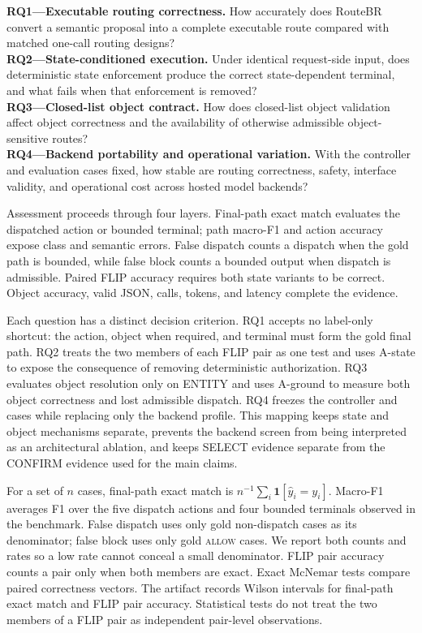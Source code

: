 \documentclass[10pt,conference,a4paper]{IEEEtran}
\newcommand{\method}{RouteBR}
\begin{document}
\noindent\textbf{RQ1---Executable routing correctness.} How accurately does \method{} convert a semantic proposal into a complete executable route compared with matched one-call routing designs?\\
\textbf{RQ2---State-conditioned execution.} Under identical request-side input, does deterministic state enforcement produce the correct state-dependent terminal, and what fails when that enforcement is removed?\\
\textbf{RQ3---Closed-list object contract.} How does closed-list object validation affect object correctness and the availability of otherwise admissible object-sensitive routes?\\
\textbf{RQ4---Backend portability and operational variation.} With the controller and evaluation cases fixed, how stable are routing correctness, safety, interface validity, and operational cost across hosted model backends?

Assessment proceeds through four layers. Final-path exact match evaluates the dispatched action or bounded terminal; path macro-F1 and action accuracy expose class and semantic errors. False dispatch counts a dispatch when the gold path is bounded, while false block counts a bounded output when dispatch is admissible. Paired FLIP accuracy requires both state variants to be correct. Object accuracy, valid JSON, calls, tokens, and latency complete the evidence.

Each question has a distinct decision criterion. RQ1 accepts no label-only shortcut: the action, object when required, and terminal must form the gold final path. RQ2 treats the two members of each FLIP pair as one test and uses A-state to expose the consequence of removing deterministic authorization. RQ3 evaluates object resolution only on ENTITY and uses A-ground to measure both object correctness and lost admissible dispatch. RQ4 freezes the controller and cases while replacing only the backend profile. This mapping keeps state and object mechanisms separate, prevents the backend screen from being interpreted as an architectural ablation, and keeps SELECT evidence separate from the CONFIRM evidence used for the main claims.

For a set of $n$ cases, final-path exact match is $n^{-1}\sum_i \mathbf{1}[\hat{y}_i=y_i]$. Macro-F1 averages F1 over the five dispatch actions and four bounded terminals observed in the benchmark. False dispatch uses only gold non-dispatch cases as its denominator; false block uses only gold \textsc{allow} cases. We report both counts and rates so a low rate cannot conceal a small denominator. FLIP pair accuracy counts a pair only when both members are exact. Exact McNemar tests compare paired correctness vectors. The artifact records Wilson intervals for final-path exact match and FLIP pair accuracy. Statistical tests do not treat the two members of a FLIP pair as independent pair-level observations.
\end{document}
